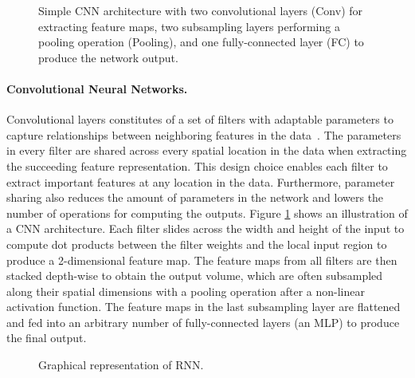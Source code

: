 


\begin{figure}[t]
	\centering
	\resizebox{0.95\textwidth}{!}{
		
	}
	\caption{Simple CNN architecture with two convolutional layers (Conv) for extracting feature maps, two subsampling layers performing a pooling operation (Pooling), and one fully-connected layer (FC) to produce the network output.}
	\label{fig:cnn_simple}
\end{figure}

\vspace{-3mm}
\paragraph{Convolutional Neural Networks.} Convolutional layers constitutes of a set of filters with adaptable parameters to capture relationships between neighboring features in the data~\cite{lecun1998gradient}. The parameters in every filter are shared across every spatial location in the data when extracting the succeeding feature representation. This design choice enables each filter to extract important features at any location in the data. Furthermore, parameter sharing also reduces the amount of parameters in the network and lowers the number of operations for computing the outputs. Figure \ref{fig:cnn_simple} shows an illustration of a CNN architecture. Each filter slides across the width and height of the input to compute dot products between the filter weights and the local input region to produce a 2-dimensional feature map. The feature maps from all filters are then stacked depth-wise to obtain the output volume, which are often subsampled along their spatial dimensions with a pooling operation after a non-linear activation function. The feature maps in the last subsampling layer are flattened and fed into an arbitrary number of fully-connected layers (an MLP) to produce the final output. 


\vspace{-3mm}
\begin{wrapfigure}{r}{0.39\textwidth}
	\centering
	\vspace{-3mm}
	\resizebox{0.39\textwidth}{!}{
		
	}
	\captionsetup{width=.9\linewidth}
	\caption{Graphical representation of RNN.}
	\vspace{-3mm}
	\label{fig:rnn}
\end{wrapfigure}
